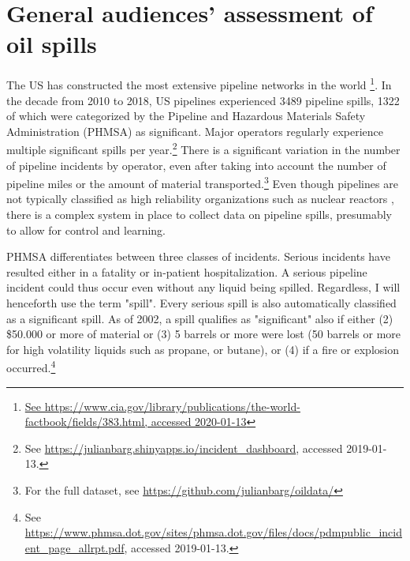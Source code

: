 \section{General audiences' assessment of oil spills}

The US has constructed the most extensive pipeline networks in the world \footnote{\url{See https://www.cia.gov/library/publications/the-world-factbook/fields/383.html, accessed 2020-01-13}}. In the decade from 2010 to 2018, US pipelines experienced 3489 pipeline spills, 1322 of which were categorized by the Pipeline and Hazardous Materials Safety Administration (PHMSA) as significant. Major operators regularly experience multiple significant spills per year.\footnote{See \url{https://julianbarg.shinyapps.io/incident_dashboard}, accessed 2019-01-13.} There is a significant variation in the number of pipeline incidents by operator, even after taking into account the number of pipeline miles or the amount of material transported.\footnote{For the full dataset, see \url{https://github.com/julianbarg/oildata/}} Even though pipelines are not typically classified as high reliability organizations such as nuclear reactors \citep[HROs;][]{Weick1999}, there is a complex system in place to collect data on pipeline spills, presumably to allow for control and learning.

PHMSA differentiates between three classes of incidents. Serious incidents have resulted either in a fatality or in-patient hospitalization. A serious pipeline incident could thus occur even without any liquid being spilled. Regardless, I will henceforth use the term "spill". Every serious spill is also automatically classified as a significant spill. As of 2002, a spill qualifies as "significant" also if either (2) \$50.000 or more of material or (3) 5 barrels or more were lost (50 barrels or more for high volatility liquids such as propane, or butane), or (4) if a fire or explosion occurred.\footnote{See \url{https://www.phmsa.dot.gov/sites/phmsa.dot.gov/files/docs/pdmpublic_incident_page_allrpt.pdf}, accessed 2019-01-13.}

